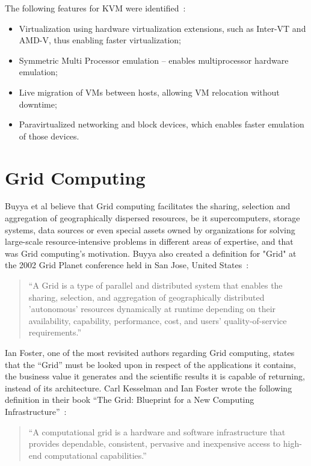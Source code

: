 The following features for KVM were identified~\cite{nuno-cardoso}:
\begin{itemize}
\item Virtualization using hardware virtualization extensions, such as Inter-VT and AMD-V, thus enabling faster virtualization;
\item Symmetric Multi Processor emulation -- enables multiprocessor hardware emulation;
\item Live migration of VMs between hosts, allowing VM relocation without downtime;
\item Paravirtualized networking and block devices, which enables faster emulation of those devices. 
\end{itemize}

\section{Grid Computing} \label{sec:grid}

Buyya et al believe that Grid computing facilitates the sharing, selection and aggregation of geographically dispersed resources, be it supercomputers, storage systems, data sources or even special assets owned by organizations for solving large-scale resource-intensive problems in different areas of expertise, and that was Grid computing's motivation.
Buyya also created a definition for "Grid" at the 2002 Grid Planet conference held in San Jose, United States~\cite{Buyya2009599}:

\begin{quote}
	``A Grid is a type of parallel and distributed system that enables the sharing, selection, and aggregation of geographically distributed 'autonomous'
 resources dynamically at runtime depending on their availability, capability, performance, cost, and users' quality-of-service requirements.''
 \end{quote} 

Ian Foster, one of the most revisited authors regarding Grid computing, states that the “Grid” must be looked upon in respect of the applications it contains, the business value it generates and the scientific results it is capable of returning, instead of its architecture.
Carl Kesselman and Ian Foster wrote the following definition in their book ``The Grid: Blueprint for a New Computing Infrastructure''~\cite{gridbook}:
\begin{quote}
``A computational grid is a hardware and software infrastructure that provides dependable, consistent, pervasive and inexpensive access to high-end computational capabilities.''
\end{quote}

